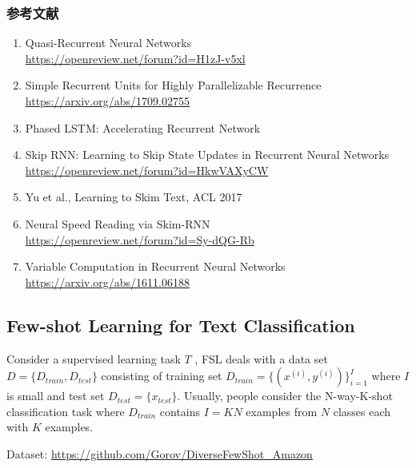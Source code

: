 \documentclass{article}
\begin{document}
\subsubsection{参考文献}
\begin{enumerate}
    \item Quasi-Recurrent Neural Networks\\ \url{https://openreview.net/forum?id=H1zJ-v5xl}
    \item Simple Recurrent Units for Highly Parallelizable Recurrence\\ \url{https://arxiv.org/abs/1709.02755}
    \item Phased LSTM: Accelerating Recurrent Network
    \item Skip RNN: Learning to Skip State Updates in Recurrent Neural Networks\\ \url{https://openreview.net/forum?id=HkwVAXyCW}
    \item Yu et al., Learning to Skim Text, ACL 2017
    \item Neural Speed Reading via Skim-RNN\\ \url{https://openreview.net/forum?id=Sy-dQG-Rb}
    \item Variable Computation in Recurrent Neural Networks\\
    \url{https://arxiv.org/abs/1611.06188}
\end{enumerate}

\subsection{Few-shot Learning for Text Classification}
Consider a supervised learning task $T$ , FSL deals with a data set $D = \{D_{train},D_{test}\}$ consisting of training set $D_{train} = \{(x^{(i)},y^{(i)})\}^I_{i=1}$ where $I$ is small and test set $D_{test} = \{x_{test}\}$. Usually, people consider the N-way-K-shot classification task  where $D_{train}$ contains $I = KN$ examples
from $N$ classes each with $K$ examples. 

Dataset: \url{https://github.com/Gorov/DiverseFewShot_Amazon}
\end{document}
